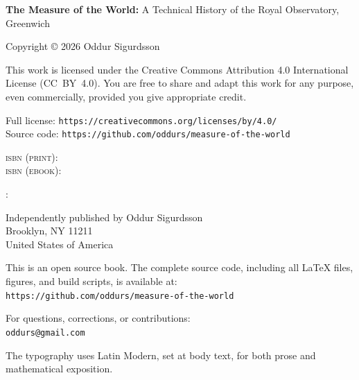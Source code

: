 {\fontsize{10}{12.5}\selectfont

\noindent
\textbf{The Measure of the World:} A Technical History of the Royal Observatory, Greenwich

\smallskip

\noindent
Copyright \copyright{} 2026 Oddur Sigurdsson

\smallskip

\noindent
This work is licensed under the Creative Commons Attribution 4.0 International License (CC~BY~4.0). You are free to share and adapt this work for any purpose, even commercially, provided you give appropriate credit.

\smallskip

\noindent
Full license: \texttt{https://creativecommons.org/licenses/by/4.0/} \\
Source code: \texttt{https://github.com/oddurs/measure-of-the-world}

\smallskip

\noindent
\textsc{isbn (print):} \isbnprint{} \\
\textsc{isbn (ebook):} \isbnebook{}

\smallskip

\noindent
\editionname: \editiondate

\smallskip

\noindent
Independently published by Oddur Sigurdsson \\
Brooklyn, NY 11211 \\
United States of America

\smallskip

\noindent
This is an open source book. The complete source code, including all \LaTeX{} files, figures, and build scripts, is available at: \\
\texttt{https://github.com/oddurs/measure-of-the-world}

\smallskip

\noindent
For questions, corrections, or contributions: \\
\texttt{oddurs@gmail.com}

\smallskip

\noindent
The typography uses Latin Modern, set at \bodyfontsize{} body text, for both prose and mathematical exposition.

}%

\vspace*{1cm}
